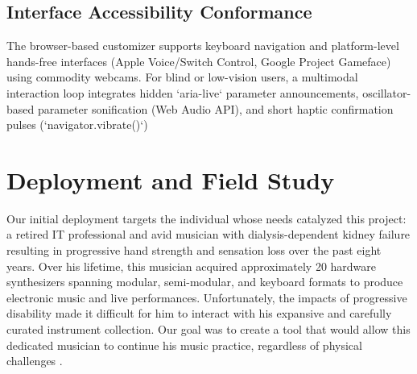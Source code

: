 \documentclass[manuscript,screen,review,anonymous]{acmart}
\begin{document}

\subsection{Interface Accessibility Conformance}
The browser-based customizer supports keyboard navigation and platform-level hands-free interfaces (Apple Voice\slash Switch Control, Google Project Gameface) using commodity webcams. For blind or low-vision users, a multimodal interaction loop integrates hidden `aria-live` parameter announcements, oscillator-based parameter sonification (Web Audio API), and short haptic confirmation pulses (`navigator.vibrate()`)

\section{Deployment and Field Study}
Our initial deployment targets the individual whose needs catalyzed this project: a retired IT professional and avid musician with dialysis-dependent kidney failure resulting in progressive hand strength and sensation loss over the past eight years. Over his lifetime, this musician acquired approximately 20 hardware synthesizers spanning modular, semi-modular, and keyboard formats to produce electronic music and live performances. %
Unfortunately, the impacts of progressive disability made it difficult for him to interact with his expansive and carefully curated instrument collection. Our goal was to create a tool that would allow this dedicated musician to continue his music practice, regardless of physical challenges \cite{mccormack2026jugaad}.
\end{document}
